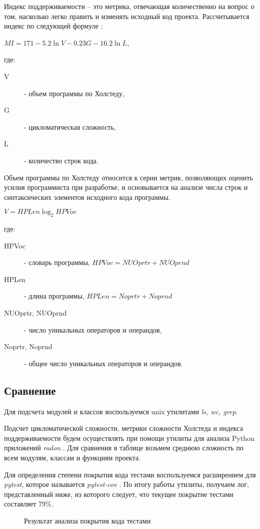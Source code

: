     Индекс поддерживаемости -- это метрика, отвечающая количественно на вопрос
    о том, насколько легко править и изменять исходный код проекта.
    Рассчитывается индекс по следующей формуле \cite{metrics.cmcons}:
    \begin{center}
        $ MI = 171 - 5.2 \ln V - 0.23G - 16.2 \ln L $,
    \end{center}
    где:
    \begin{description}
        \item [V] - объем программы по Холстеду,
        \item [G] - цикломатическая сложность,
        \item [L] - количество строк кода.
    \end{description}

    Объем программы по Холстеду относится к серии метрик, позволяющих оценить
    усилия программиста при разработке, и основывается на анализе числа строк
    и синтаксических элементов исходного кода программы.
    \begin{center}
        $ V = HPLen \log_{2}HPVoc $
    \end{center}
    где:
    \begin{description}
        \item [HPVoc] - словарь программы,
        $ HPVoc = NUOprtr + NUOprnd $
        \item [HPLen] - длина программы,
        $ HPLen = Noprtr + Noprnd $
        \item [NUOprtr, NUOprnd] - число уникальных операторов и операндов,
        \item [Noprtr, Noprnd] - общее число уникальных операторов и операндов.
    \end{description}

    \subsection{Сравнение}
    Для подсчета модулей и классов воспользуемся unix утилитами \textit{ls, wc, grep}.

    Подсчет цикломатической сложности, метрики сложности Холстеда и индекса
    поддерживаемости будем осуществлять при помощи утилиты для
    анализа Python приложений \textit{radon} \cite{complexity.radon}.
    Для сравнения в таблице возьмем среднюю сложность по всем модулям, классам
    и функциям проекта.
    
    Для определения степени покрытия кода тестами воспользуемся расширением для
    \textit{pytest}, которое называется \textit{pytest-cov}
    \cite{test.pytest.cov}.
    По итогу работы утилиты, получаем лог, представленный ниже, из которого
    следует, что текущее покрытие тестами составляет 79\%.
    \begin{figure}[H]
        \centering
        
        \caption{Результат анализа покрытия кода тестами}
        \label{fig:pytest-coverage}
    \end{figure}

